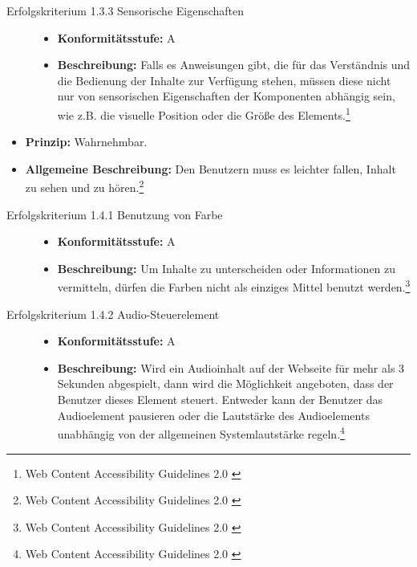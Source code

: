 \begin{description}
\begin{description}
		\item[Erfolgskriterium 1.3.3 Sensorische Eigenschaften]\hfill
		\begin{itemize}
			\item \textbf{Konformitätsstufe:} A
			\item \textbf{Beschreibung:} Falls es Anweisungen gibt, die für das Verständnis und die Bedienung der Inhalte zur Verfügung stehen, müssen diese 
			nicht nur von sensorischen Eigenschaften der Komponenten abhängig sein, wie z.B. die visuelle Position oder die Größe des 
			Elements.\footnote{Web Content Accessibility Guidelines 2.0 \cite{WCAG2.0}}
		\end{itemize}
	\end{description}

	\item[Richtlinie 1.4 Unterscheidbar]\hfill
	\begin{itemize}
		\item \textbf{Prinzip:} Wahrnehmbar.
		\item \textbf{Allgemeine Beschreibung:} Den Benutzern muss es leichter fallen, Inhalt zu sehen und zu hören.\footnote{Web Content Accessibility Guidelines 2.0 \cite{WCAG2.0}}
	\end{itemize}
	
	\begin{description}
		\item[Erfolgskriterium 1.4.1 Benutzung von Farbe]\hfill
		\begin{itemize}
			\item \textbf{Konformitätsstufe:} A
			\item \textbf{Beschreibung:} Um Inhalte zu unterscheiden oder Informationen zu vermitteln, dürfen die Farben nicht als einziges Mittel benutzt 
			werden.\footnote{Web Content Accessibility Guidelines 2.0 \cite{WCAG2.0}}
		\end{itemize}
		
		\item[Erfolgskriterium 1.4.2 Audio-Steuerelement]\hfill
		\begin{itemize}
			\item \textbf{Konformitätsstufe:} A
			\item \textbf{Beschreibung:} Wird ein Audioinhalt auf der Webseite für mehr als 3 Sekunden abgespielt, dann wird die Möglichkeit angeboten, dass der 
			Benutzer dieses Element steuert. Entweder kann der Benutzer das Audioelement pausieren oder die Lautstärke des Audioelements unabhängig von der 
			allgemeinen Systemlautstärke regeln.\footnote{Web Content Accessibility Guidelines 2.0 \cite{WCAG2.0}}
		\end{itemize}
		

\end{description}
\end{description}
